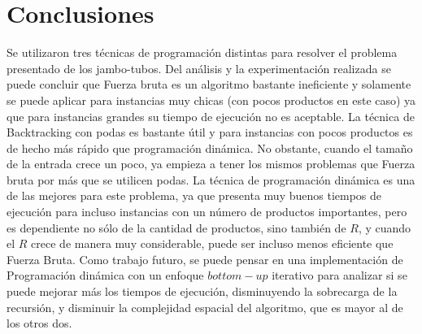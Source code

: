 \documentclass[10pt,a4paper]{article}
\begin{document}
\section{Conclusiones} \label{sec:conclusiones}
Se utilizaron tres técnicas de programación distintas para resolver el problema presentado de los jambo-tubos. Del análisis y la experimentación realizada se puede concluir que Fuerza bruta es un algoritmo bastante ineficiente y solamente se puede aplicar para instancias muy chicas (con pocos productos en este caso) ya que para instancias grandes su tiempo de ejecución no es aceptable. La técnica de Backtracking con podas es bastante útil y para instancias con pocos productos es de hecho más rápido que programación dinámica. No obstante, cuando el tamaño de la entrada crece un poco, ya empieza a tener los mismos problemas que Fuerza bruta por más que se utilicen podas. La técnica de programación dinámica es una de las mejores para este problema, ya que presenta muy buenos tiempos de ejecución para incluso instancias con un número de productos importantes, pero es dependiente no sólo de la cantidad de productos, sino también de $R$, y cuando el $R$ crece de manera muy considerable, puede ser incluso menos eficiente que Fuerza Bruta. Como trabajo futuro, se puede pensar en una implementación de Programación dinámica con un enfoque $bottom-up$ iterativo para analizar si se puede mejorar más los tiempos de ejecución, disminuyendo la sobrecarga de la recursión, y disminuir la complejidad espacial del algoritmo, que es mayor al de los otros dos.
\end{document}
